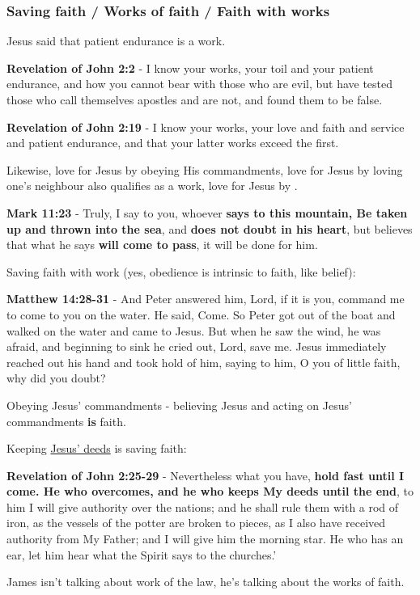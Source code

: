 \documentclass[11pt]{article}
\begin{document}
\subsubsection{Saving faith / Works of faith / Faith with works}
\label{sec:orga3b29d9}
Jesus said that patient endurance is a work.

\textbf{Revelation of John 2:2} - I know your works, your toil and your patient endurance, and how you cannot bear with those who are evil, but have tested those who call themselves apostles and are not, and found them to be false.

\textbf{Revelation of John 2:19} - I know your works, your love and faith and service and patient endurance, and that your latter works exceed the first.

Likewise, love for Jesus by obeying His commandments, love for Jesus by loving one's neighbour also qualifies as a work, love for Jesus by .

\textbf{Mark 11:23} - Truly, I say to you, whoever \textbf{says to this mountain, Be taken up and thrown into the sea}, and \textbf{does not doubt in his heart}, but believes that what he says \textbf{will come to pass}, it will be done for him.

Saving faith with work (yes, obedience is intrinsic to faith, like belief):

\textbf{Matthew 14:28-31} - And Peter answered him, Lord, if it is you, command me to come to you on the water. He said, Come. So Peter got out of the boat and walked on the water and came to Jesus. But when he saw the wind, he was afraid, and beginning to sink he cried out, Lord, save me. Jesus immediately reached out his hand and took hold of him, saying to him, O you of little faith, why did you doubt?

Obeying Jesus' commandments - believing Jesus and acting on Jesus' commandments \textbf{is} faith.

Keeping \uline{Jesus' deeds} is saving faith:

\textbf{Revelation of John 2:25-29} - Nevertheless what you have, \textbf{hold fast until I come. He who overcomes, and he who keeps My deeds until the end}, to him I will give authority over the nations; and he shall rule them with a rod of iron, as the vessels of the potter are broken to pieces, as I also have received authority from My Father; and I will give him the morning star. He who has an ear, let him hear what the Spirit says to the churches.’

James isn't talking about work of the law, he's talking about the works of faith.
\end{document}
